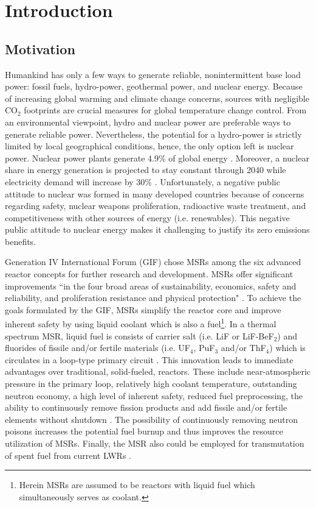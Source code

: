\chapter[Introduction]{Introduction}

\section{Motivation}

Humankind has only a few ways to generate reliable, nonintermittent 
base load power: fossil fuels, hydro-power, geothermal power, and 
nuclear energy. Because of increasing global warming and climate 
change concerns, sources with negligible CO$_2$ footprints 
are crucial measures for global temperature change control. 
From an environmental viewpoint, hydro and nuclear power are 
preferable ways to generate reliable power. Nevertheless, the 
potential for a hydro-power is strictly limited by local geographical 
conditions, hence, the only option left is nuclear power. Nuclear 
power plants generate 4.9\% of global energy \cite{noauthor_key_2017}. 
Moreover, a nuclear share in energy generation is projected to stay 
constant through 2040 while electricity demand will 
increase by 30\% \cite{noauthor_world_2017}. Unfortunately, a negative 
public attitude to nuclear was formed in many developed countries 
because of concerns regarding safety, nuclear weapons 
proliferation, radioactive waste treatment, and competitiveness with 
other sources of energy (i.e. renewables). This negative public 
attitude to nuclear energy makes it challenging to justify its zero 
emissions benefits.

Generation IV International Forum (GIF) chose \glspl{MSR} among the 
six advanced reactor concepts for further research and development. 
\glspl{MSR} 
offer significant improvements ``in the four broad areas of 
sustainability, economics, safety and reliability, and proliferation 
resistance and physical protection" \cite{doe_technology_2002}. To 
achieve the goals formulated by the GIF, \glspl{MSR} 
simplify the reactor core and improve inherent safety by using 
liquid coolant which is also a fuel\footnote{Herein \glspl{MSR} are 
assumed to be reactors with liquid fuel which simultaneously serves 
as coolant.}. In a thermal spectrum \gls{MSR}, liquid fuel is consists 
of carrier salt (i.e. LiF or LiF-BeF$_2$) and fluorides of fissile 
and/or fertile materials (i.e. UF$_4$, PuF$_3$ and/or ThF$_4$) 
which is circulates in a loop-type primary circuit 
\cite{haubenreich_experience_1970}. 
This innovation leads to immediate advantages over traditional, 
solid-fueled, reactors. These include near-atmospheric pressure 
in the primary loop, relatively high coolant temperature, outstanding 
neutron economy, a high level of inherent safety, reduced fuel 
preprocessing, the ability to continuously remove fission products 
and add fissile and/or fertile elements without shutdown 
\cite{leblanc_molten_2010}. The possibility of continuously removing 
neutron poisons increases the potential fuel burnup and thus 
improves the resource utilization of \glspl{MSR}. Finally, the \gls{MSR} 
also could be employed for transmutation of 
spent fuel from current \glspl{LWR} \cite{fratoni_design_2004}.

